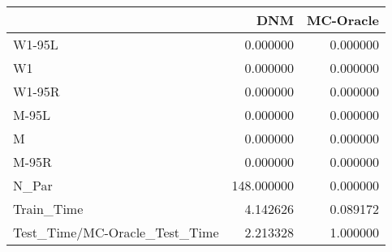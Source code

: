 \begin{tabular}{lrr}
\toprule
{} &         DNM &  MC-Oracle \\
\midrule
W1-95L                        &    0.000000 &   0.000000 \\
W1                            &    0.000000 &   0.000000 \\
W1-95R                        &    0.000000 &   0.000000 \\
M-95L                         &    0.000000 &   0.000000 \\
M                             &    0.000000 &   0.000000 \\
M-95R                         &    0.000000 &   0.000000 \\
N\_Par                         &  148.000000 &   0.000000 \\
Train\_Time                    &    4.142626 &   0.089172 \\
Test\_Time/MC-Oracle\_Test\_Time &    2.213328 &   1.000000 \\
\bottomrule
\end{tabular}
